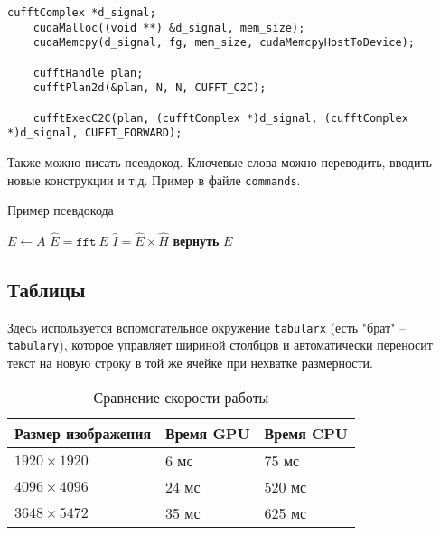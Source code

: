 \begin{lstlisting}[caption={Пример вызова БПФ в библиотеке \texttt{CuFFT}}]
	cufftComplex *d_signal;
	cudaMalloc((void **) &d_signal, mem_size); 
	cudaMemcpy(d_signal, fg, mem_size, cudaMemcpyHostToDevice);
	
	cufftHandle plan;
	cufftPlan2d(&plan, N, N, CUFFT_C2C);
	
	cufftExecC2C(plan, (cufftComplex *)d_signal, (cufftComplex *)d_signal, CUFFT_FORWARD);
\end{lstlisting}

Также можно писать псевдокод. Ключевые слова можно переводить, вводить новые конструкции и т.д. Пример в файле \texttt{commands}.
\begin{algorithm}
    \caption{Пример псевдокода}
    \begin{algorithmic}[1] %
        \State $E \gets A$
        \State $\hat{E} = \texttt{fft}~E$
        \State $\hat{I} = \hat{E}\times \hat{H}$
        \EndFor
        \State \textbf{вернуть} $E$
        \EndProcedure
    \end{algorithmic}
\end{algorithm}

\subsection{Таблицы}
Здесь используется вспомогательное окружение \texttt{tabularx} (есть "брат" -- \texttt{tabulary}), которое управляет шириной столбцов и автоматически переносит текст на новую строку в той же ячейке при нехватке размерности.

\begin{table}[H]
	\centering
	\begin{tabularx}{\textwidth}{| X | X | X |}
		\hline
		\textbf{Размер изображения} & \textbf{Время GPU} & \textbf{Время CPU} \\ \hline
		$1920\times 1920$           & 6 мс               & 75 мс              \\ \hline
		$4096\times 4096$           & 24 мс              & 520 мс             \\ \hline
		$3648\times 5472$           & 35 мс              & 625 мс             \\ \hline
	\end{tabularx}
	\caption{Сравнение скорости работы}
\end{table}

